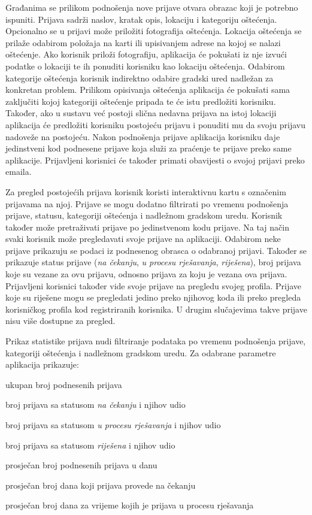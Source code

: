 		Građanima se prilikom podnošenja nove prijave otvara obrazac koji je potrebno ispuniti. Prijava sadrži naslov, kratak opis, lokaciju i kategoriju oštećenja. Opcionalno se u prijavi može priložiti fotografija oštećenja. Lokacija oštećenja se prilaže odabirom položaja na karti ili upisivanjem adrese na kojoj se nalazi oštećenje. Ako korisnik priloži fotografiju, aplikacija će pokušati iz nje izvući podatke o lokaciji te ih ponuditi korisniku kao lokaciju oštećenja. Odabirom kategorije oštećenja korisnik indirektno odabire gradski ured nadležan za konkretan problem. Prilikom opisivanja oštećenja aplikacija će pokušati sama zaključiti kojoj kategoriji oštećenje pripada te će istu predložiti korisniku. Također, ako u sustavu već postoji slična nedavna prijava na istoj lokaciji aplikacija će predložiti korisniku postojeću prijavu i ponuditi mu da svoju prijavu nadoveže na postojeću. Nakon podnošenja prijave aplikacija korisniku daje jedinstveni kod podnesene prijave koja služi za praćenje te prijave preko same aplikacije. Prijavljeni korisnici će također primati obavijesti o svojoj prijavi preko emaila.
		
		Za pregled postojećih prijava korisnik koristi interaktivnu kartu s označenim prijavama na njoj. Prijave se mogu dodatno filtrirati po vremenu podnošenja prijave, statusu, kategoriji oštećenja i nadležnom gradskom uredu. Korisnik također može pretraživati prijave po jedinstvenom kodu prijave. Na taj način svaki korisnik može pregledavati svoje prijave na aplikaciji. Odabirom neke prijave prikazuju se podaci iz podnesenog obrasca o odabranoj prijavi. Također se prikazuje status prijave (\textit{na čekanju}, \textit{u procesu rješavanja}, \textit{riješena}), broj prijava koje su vezane za ovu prijavu, odnosno prijava za koju je vezana ova prijava. Prijavljeni korisnici također vide svoje prijave na pregledu svojeg profila. Prijave koje su riješene mogu se pregledati jedino preko njihovog koda ili preko pregleda korisničkog profila kod registriranih korisnika. U drugim slučajevima takve prijave nisu više dostupne za pregled.
		
		Prikaz statistike prijava nudi filtriranje podataka po vremenu podnošenja prijave, kategoriji oštećenja i nadležnom gradskom uredu. Za odabrane parametre aplikacija prikazuje:
		\begin{packed_item} 
			\item ukupan broj podnesenih prijava
			\item broj prijava sa statusom \textit{na čekanju} i njihov udio
			\item broj prijava sa statusom \textit{u procesu rješavanja} i njihov udio
			\item broj prijava sa statusom \textit{riješena} i njihov udio
			\item prosječan broj podnesenih prijava u danu
			\item prosječan broj dana koji prijava provede na čekanju
			\item prosječan broj dana za vrijeme kojih je prijava u procesu rješavanja
		\end{packed_item}
		
